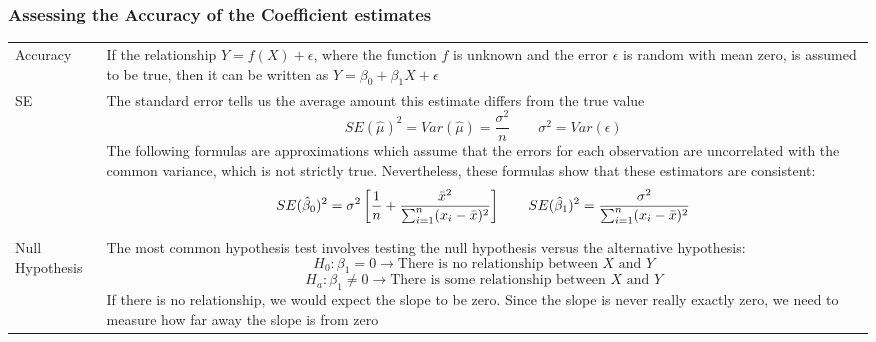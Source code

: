 \subsubsection{Assessing the Accuracy of the Coefficient estimates}
\begin{onehalfspace}
	\begin{tabularx}{\textwidth}{p{3cm}X}
		Accuracy & If the relationship $Y = f(X)+\epsilon$, where the function $f$ is unknown and the error $\epsilon$ is 
		random with mean zero, is assumed to be true, then it can be written as $Y = \beta_0+\beta_1 X+\epsilon$ \\
		SE & The standard error tells us the average amount this estimate differs from the true value
		\[ SE(\hat{\mu})^2 = Var(\hat{\mu}) = \frac{\sigma^2}{n} \qquad \sigma^2 = Var(\epsilon) \]
		The following formulas are approximations which assume that the errors for each observation are uncorrelated with
		the common variance, which is not strictly true. Nevertheless, these formulas show that these estimators are
		consistent:
		\[ SE(\hat{\beta}_0)^2 = \sigma^2 \left[ \frac{1}{n}+\frac{\bar{x}^2}{\sum_{i=1}^{n}(x_i-\bar{x})^2} \right] \qquad
		SE(\hat{\beta}_1)^2 = \frac{\sigma^2}{\sum_{i=1}^{n} (x_i-\bar{x})^2}  \] \\
		Null Hypothesis & The most common hypothesis test involves testing the null hypothesis versus the alternative 
		hypothesis: \[ H_0 : \beta_1 = 0 \rightarrow \text{There is no relationship between } X \text{ and } Y \]
		\[ H_a : \beta_1 \neq 0 \rightarrow \text{There is some relationship between } X \text{ and } Y \]
		If there is no relationship, we would expect the slope to be zero. Since the slope is never really exactly zero, we
		need to measure how far away the slope is from zero\\
	\end{tabularx}
		

\end{onehalfspace}
